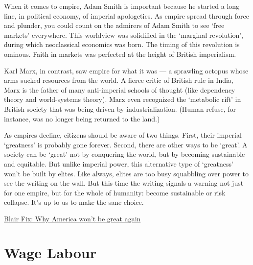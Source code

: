\documentclass[
]{book}
\begin{document}
When it comes to empire, Adam Smith is important because he started a long line, in political economy, of imperial apologetics. As empire spread through force and plunder, you could count on the admirers of Adam Smith to see `free markets' everywhere. This worldview was solidified in the `marginal revolution', during which neoclassical economics was born. The timing of this revolution is ominous. Faith in markets was perfected at the height of British imperialism.

Karl Marx, in contrast, saw empire for what it was --- a sprawling octopus whose arms sucked resources from the world. A fierce critic of British rule in India, Marx is the father of many anti-imperial schools of thought (like dependency theory and world-systems theory). Marx even recognized the `metabolic rift' in British society that was being driven by industrialization. (Human refuse, for instance, was no longer being returned to the land.)

As empires decline, citizens should be aware of two things. First, their imperial `greatness' is probably gone forever. Second, there are other ways to be `great'. A society can be `great' not by conquering the world, but by becoming sustainable and equitable. But unlike imperial power, this alternative type of `greatness' won't be built by elites. Like always, elites are too busy squabbling over power to see the writing on the wall. But this time the writing signals a warning not just for one empire, but for the whole of humanity: become sustainable or risk collapse. It's up to us to make the sane choice.

\href{https://economicsfromthetopdown.com/2020/07/11/why-america-wont-be-great-again/}{Blair Fix: Why America won't be great again}

\hypertarget{wage-labour}{%
\section{Wage Labour}\label{wage-labour}}
\end{document}
